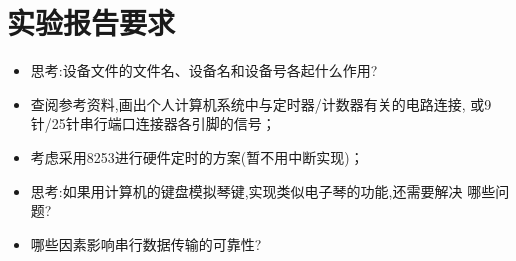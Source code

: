 \section{实验报告要求}
\begin{itemize}\itemsep=-3pt
  \item 思考:设备文件的文件名、设备名和设备号各起什么作用?
  \item 查阅参考资料,画出个人计算机系统中与定时器/计数器有关的电路连接,
		或9针/25针串行端口连接器各引脚的信号；
  \item 考虑采用8253进行硬件定时的方案(暂不用中断实现)；
  \item 思考:如果用计算机的键盘模拟琴键,实现类似电子琴的功能,还需要解决
		哪些问题?
  \item 哪些因素影响串行数据传输的可靠性?
\end{itemize}
